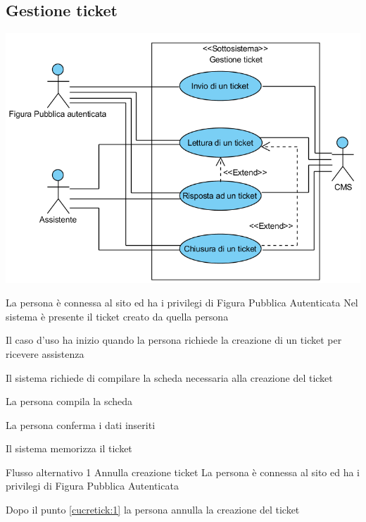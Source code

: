 \subsection{Gestione ticket}
\begin{center}
   \includegraphics[width=\textwidth]{assets/visualParadigm/cu/GestioneTicket}
\end{center}
{}
{La persona è connessa al sito ed ha i privilegi di Figura Pubblica Autenticata}
{Nel sistema è presente il ticket creato da quella persona}
{\begin{enumCU}
	\item Il caso d'uso ha inizio quando la persona richiede la creazione di un ticket per ricevere assistenza
	\item Il sistema richiede di compilare la scheda necessaria alla creazione del ticket
	\item La persona compila la scheda\label{cucretick:1}
	\item La persona conferma i dati inseriti
	\item Il sistema memorizza il ticket
\end{enumCU}}
%
{Flusso alternativo 1}%
{Annulla creazione ticket}%
{La persona è connessa al sito ed ha i privilegi di Figura Pubblica Autenticata}%
{\postNulle}%
{\begin{enumCU}
		\item Dopo il punto \ref{cucretick:1} la persona annulla la creazione del ticket
	\end{enumCU}}%

